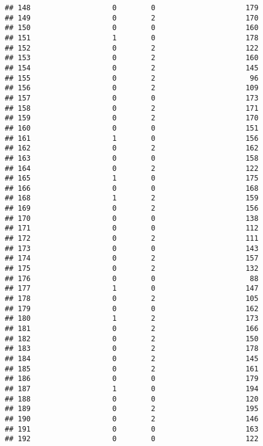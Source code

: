 \documentclass[]{article}
\begin{document}
\begin{verbatim}
## 148                   0        0                     179
## 149                   0        2                     170
## 150                   0        0                     160
## 151                   1        0                     178
## 152                   0        2                     122
## 153                   0        2                     160
## 154                   0        2                     145
## 155                   0        2                      96
## 156                   0        2                     109
## 157                   0        0                     173
## 158                   0        2                     171
## 159                   0        2                     170
## 160                   0        0                     151
## 161                   1        0                     156
## 162                   0        2                     162
## 163                   0        0                     158
## 164                   0        2                     122
## 165                   1        0                     175
## 166                   0        0                     168
## 168                   1        2                     159
## 169                   0        2                     156
## 170                   0        0                     138
## 171                   0        0                     112
## 172                   0        2                     111
## 173                   0        0                     143
## 174                   0        2                     157
## 175                   0        2                     132
## 176                   0        0                      88
## 177                   1        0                     147
## 178                   0        2                     105
## 179                   0        0                     162
## 180                   1        2                     173
## 181                   0        2                     166
## 182                   0        2                     150
## 183                   0        2                     178
## 184                   0        2                     145
## 185                   0        2                     161
## 186                   0        0                     179
## 187                   1        0                     194
## 188                   0        0                     120
## 189                   0        2                     195
## 190                   0        2                     146
## 191                   0        0                     163
## 192                   0        0                     122

\end{verbatim}
\end{document}
